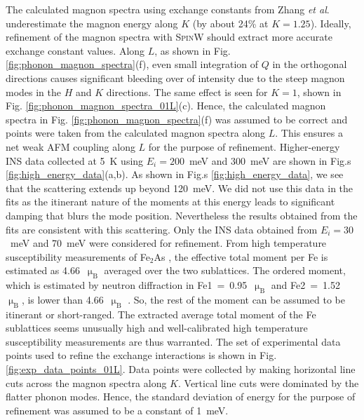 \documentclass[letterpaper,10pt,doublespacing,edeposit]{uiucthesis2020}
\begin{document}
\begin{mainmatter}
The calculated magnon spectra using exchange constants from Zhang \emph{et al}. \cite{Zhang2013} underestimate the magnon energy along $K$ (by about 24\% at $K = 1.25$).
Ideally, refinement of the magnon spectra with \textsc{SpinW} \cite{Toth_2015} should extract more accurate exchange constant values.
Along $L$, as shown in Fig. \ref{fig:phonon_magnon_spectra}(f), even small integration of $Q$ in the orthogonal directions causes significant bleeding over of intensity due to the steep magnon modes in the $H$ and $K$ directions. The same effect is seen for $K = 1$, shown in Fig. \ref{fig:phonon_magnon_spectra_01L}(c).
Hence, the calculated magnon spectra in Fig. \ref{fig:phonon_magnon_spectra}(f) was assumed to be correct and points were taken from the calculated magnon spectra along $L$. This ensures a net weak AFM coupling along $L$ for the purpose of refinement.
Higher-energy INS data collected at 5~K using $E_i=200$~meV and 300~meV are shown in Fig.s \ref{fig:high_energy_data}(a,b). As shown in Fig.s \ref{fig:high_energy_data}, we see that the scattering extends up beyond 120~meV. We did not use this data in the fits as the itinerant nature of the moments at this energy leads to significant damping that blurs the mode position.  Nevertheless the results obtained from the fits are consistent with this scattering. Only the INS data obtained from $E_i=30$~meV and 70~meV  were considered for refinement.
From high temperature susceptibility measurements of Fe$_2$As \cite{Katsuraki1966}, the effective total moment per Fe is estimated as 4.66~$\upmu_\text{B}$ averaged over the two sublattices. The ordered moment, which is estimated by neutron diffraction in Fe1~=~0.95~$\upmu_\text{B}$ and Fe2~=~1.52~$\upmu_\text{B}$, is lower than 4.66~$\upmu_\text{B}$ \cite{Katsuraki1966,Zhang2013}. So, the rest of the moment can be assumed to be itinerant or short-ranged. The extracted average total moment of the Fe sublattices seems unusually high and well-calibrated high temperature susceptibility measurements are thus warranted.
The set of experimental data points used to refine the exchange interactions is shown in Fig. \ref{fig:exp_data_points_01L}. Data points were collected by making horizontal line cuts across the magnon spectra along $K$. Vertical line cuts were dominated by the flatter phonon modes. Hence, the standard deviation of energy for the purpose of refinement was assumed to be a constant of 1~meV.



\end{mainmatter}
\end{document}

